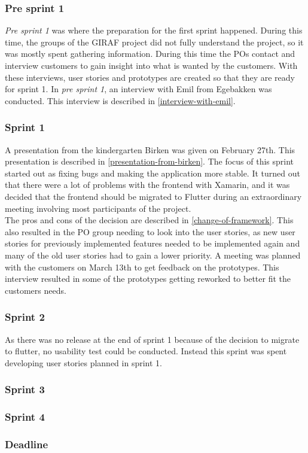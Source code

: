 
\subsubsection{Pre sprint 1}
\textit{Pre sprint 1} was where the preparation for the first sprint happened.
During this time, the groups of the GIRAF project did not fully understand the project, so it was mostly spent gathering information.
During this time the POs contact and interview customers to gain insight into what is wanted by the customers.
With these interviews, user stories and prototypes are created so that they are ready for sprint 1.
In \textit{pre sprint 1}, an interview with Emil from Egebakken was conducted. 
This interview is described in \autoref{interview-with-emil}.

\subsubsection{Sprint 1}
A presentation from the kindergarten Birken was given on February 27th.
This presentation is described in \autoref{presentation-from-birken}.
The focus of this sprint started out as fixing bugs and making the application more stable.
It turned out that there were a lot of problems with the frontend with Xamarin, and it was decided that the frontend should be migrated to Flutter during an extraordinary meeting involving most participants of the project. \\
The pros and cons of the decision are described in \autoref{change-of-framework}.
This also resulted in the PO group needing to look into the user stories, as new user stories for previously implemented features needed to be implemented again and many of the old user stories had to gain a lower priority.
A meeting was planned with the customers on March 13th to get feedback on the prototypes. 
This interview resulted in some of the prototypes getting reworked to better fit the customers needs.

\subsubsection{Sprint 2}
As there was no release at the end of sprint 1 because of the decision to migrate to flutter, no usability test could be conducted.
Instead this sprint was spent developing user stories planned in sprint 1.



\subsubsection{Sprint 3}

\subsubsection{Sprint 4}
\subsubsection{Deadline}

